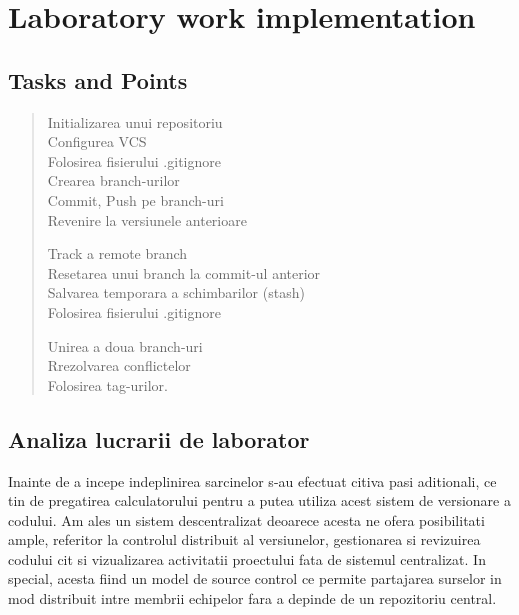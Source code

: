 \section{Laboratory work implementation}

\subsection{Tasks and Points}

\begin{quote}
\begin{description}

	Initializarea unui repositoriu \\
	Configurea VCS\\
	Folosirea fisierului .gitignore\\
	Crearea branch-urilor\\
	Commit, Push pe branch-uri\\
	Revenire la versiunele anterioare
	
	Track a remote branch\\
	Resetarea unui branch la commit-ul anterior\\
	Salvarea temporara a schimbarilor (stash)\\
	Folosirea fisierului .gitignore
		
	Unirea a doua branch-uri\\
	Rrezolvarea conflictelor\\
	Folosirea tag-urilor.

\end{description}
\end{quote}

\subsection{Analiza lucrarii de laborator}

Inainte de a incepe indeplinirea sarcinelor s-au efectuat citiva pasi aditionali, ce tin de pregatirea calculatorului pentru a putea utiliza acest sistem de versionare a codului. Am ales un sistem descentralizat deoarece acesta ne ofera posibilitati ample, referitor la controlul distribuit al versiunelor, gestionarea si revizuirea codului cit si vizualizarea activitatii proectului fata de sistemul centralizat. In special, acesta fiind un model de source control ce permite partajarea surselor in mod distribuit intre membrii echipelor fara a depinde de un repozitoriu central.

\begin{flushleft} %
\end{flushleft}

